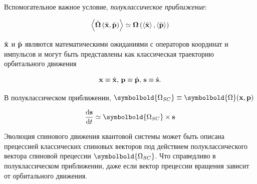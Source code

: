 \begin{frame}
		\noindent Вспомогательное важное условие, \textit{полуклассическое приближение}:
	
	\begin{equation}
		\left\langle\hat{\boldsymbol{\Omega}}\left(\hat{\vectorbold{x}}, \hat{\vectorbold{p}}\right)\right\rangle \simeq \boldsymbol{\Omega}\left(\left\langle\hat{\vectorbold{x}}\right\rangle, \left\langle\hat{\vectorbold{p}}\right\rangle\right) 
		\label{eq:semi_class}
	\end{equation}
	
	\noindent $\hat{\vectorbold{x}}$ и $\hat{\vectorbold{p}}$ являются математическими ожиданиями $с$ операторов координат и импульсов и могут быть представлены как классическая траекторию орбитального движения
	
	\begin{equation}
		\vectorbold{x}\equiv\hat{\vectorbold{x}}, \, \vectorbold{p}\equiv\hat{\vectorbold{p}}, \, \vectorbold{s}\equiv\hat{\vectorbold{s}}.
		\label{eq:classical}
	\end{equation}
	
	\noindent В полуклассическом приближении, $\symbolbold{\Omega_{SC}}\equiv\symbolbold{\Omega}(\vectorbold{x}, \vectorbold{p})$
	
	\begin{equation}
		\dv{\vectorbold{s}}{t} \simeq \symbolbold{\Omega_{SC}} \times \vectorbold{s}
		\label{eq:classical_spin}
	\end{equation}
	
	\par Эволюция спинового движения квантовой системы может быть описана прецессией классических спиновых векторов под действием полуклассического вектора спиновой прецессии $\symbolbold{\Omega_{SC}}$. Что справедливо в полуклассическом приближении, даже если вектор прецессии вращения зависит от орбитального движения.
\end{frame}